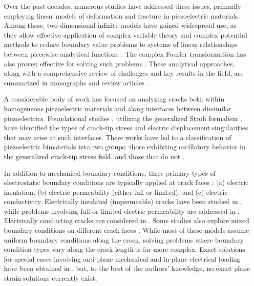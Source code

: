 Over the past decades, numerous studies have addressed these issues, primarily employing linear models of deformation and fracture in piezoelectric materials. Among these, two-dimensional infinite models have gained widespread use, as they allow effective application of complex variable theory and complex potential methods to reduce boundary value problems to systems of linear relationships between piecewise analytical functions \cite{Adlucky16}. The complex Fourier transformation has also proven effective for solving such problems \cite{Adlucky25,Adlucky56}. These analytical approaches, along with a comprehensive review of challenges and key results in the field, are summarized in monographs \cite{Adlucky12,Adlucky57} and review articles \cite{Adlucky8,Adlucky16,Adlucky18,Adlucky34,Adlucky69,Adlucky70}.

A considerable body of work has focused on analyzing cracks both within homogeneous piezoelectric materials and along interfaces between dissimilar piezoelectrics. Foundational studies \cite{Adlucky63,Adlucky64}, utilizing the generalized Stroh formalism \cite{Adlucky62}, have identified the types of crack-tip stress and electric displacement singularities that may arise at such interfaces. These works have led to a classification of piezoelectric bimaterials into two groups: those exhibiting oscillatory behavior in the generalized crack-tip stress field, and those that do not \cite{Adlucky48,Adlucky49,Adlucky50,Adlucky51,Adlucky52}.

In addition to mechanical boundary conditions, three primary types of electrostatic boundary conditions are typically applied at crack faces \cite{Adlucky16}: (a) electric insulation, (b) electric permeability (either full or limited), and (c) electric conductivity. Electrically insulated (impermeable) cracks have been studied in \cite{Adlucky14,Adlucky22,Adlucky43,Adlucky53,Adlucky60,Adlucky63}, while problems involving full or limited electric permeability are addressed in \cite{Adlucky6,Adlucky15,Adlucky16,Adlucky20,Adlucky21,Adlucky23,Adlucky35,Adlucky36,Adlucky38,Adlucky40,Adlucky65,Adlucky66}. Electrically conducting cracks are considered in \cite{Adlucky5,Adlucky24,Adlucky42,Adlucky64}. Some studies also explore mixed boundary conditions on different crack faces \cite{Adlucky17,Adlucky58}. While most of these models assume uniform boundary conditions along the crack, solving problems where boundary condition types vary along the crack length is far more complex. Exact solutions for special cases involving anti-plane mechanical and in-plane electrical loading have been obtained in \cite{Adlucky46,Adlucky47}, but, to the best of the authors’ knowledge, no exact plane strain solutions currently exist.

